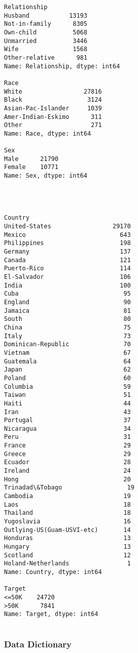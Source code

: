 \documentclass[11pt]{article}
\begin{document}
\begin{Verbatim}[commandchars=\\\{\}]
Relationship
Husband           13193
Not-in-family      8305
Own-child          5068
Unmarried          3446
Wife               1568
Other-relative      981
Name: Relationship, dtype: int64

Race
White                 27816
Black                  3124
Asian-Pac-Islander     1039
Amer-Indian-Eskimo      311
Other                   271
Name: Race, dtype: int64

Sex
Male      21790
Female    10771
Name: Sex, dtype: int64




Country
United-States                 29170
Mexico                          643
Philippines                     198
Germany                         137
Canada                          121
Puerto-Rico                     114
El-Salvador                     106
India                           100
Cuba                             95
England                          90
Jamaica                          81
South                            80
China                            75
Italy                            73
Dominican-Republic               70
Vietnam                          67
Guatemala                        64
Japan                            62
Poland                           60
Columbia                         59
Taiwan                           51
Haiti                            44
Iran                             43
Portugal                         37
Nicaragua                        34
Peru                             31
France                           29
Greece                           29
Ecuador                          28
Ireland                          24
Hong                             20
Trinadad\&Tobago                  19
Cambodia                         19
Laos                             18
Thailand                         18
Yugoslavia                       16
Outlying-US(Guam-USVI-etc)       14
Honduras                         13
Hungary                          13
Scotland                         12
Holand-Netherlands                1
Name: Country, dtype: int64

Target
<=50K    24720
>50K      7841
Name: Target, dtype: int64


    \end{Verbatim}

    \subsubsection{Data Dictionary}\label{data-dictionary}
\end{document}
